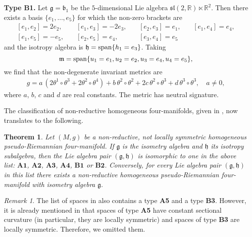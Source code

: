 \documentclass{amsart}
\theoremstyle{plain}
\newtheorem{theorem}{Theorem}
\theoremstyle{remark}
\newtheorem{remark}{Remark}
\def\R{\mathbb{R}}
\newcommand\B{{\mathfrak{b}}}
\newcommand\g{{\mathfrak{g}}}
\newcommand\h{{\mathfrak{h}}}
\newcommand\m{{\mathfrak{m}}}
\begin{document}
\medskip\noindent
{\bf Type B1.} Let $\g =\B_1$ be the $5$-dimensional Lie algebra  $\mathfrak{sl}(2,\R) \ltimes \R ^2 $. Then there exists a basis $\{e_1,\ldots,e_5\}$ for which the non-zero brackets are
\[
\begin{array}{llll}
[e_1,e_2]=2e_2, \quad & [e_1,e_3]=-2e_3, \quad & [e_2,e_3]=e_1, \quad & [e_1,e_4]=e_4, \\[2 pt]
[e_1,e_5]=-e_5, \quad & [e_2,e_5]=e_4, \quad  & [e_3,e_4]=e_5  \quad &
\end{array}
\]
and the isotropy algebra is $\h={\rm span}\{h_1=e_3\}$. Taking
\begin{equation}\label{eq:mB1}
\m= {\rm span}\{u_1=e_1,u_2=e_2,u_3=e_4,u_4=e_5\},
\end{equation}
we find that the non-degenerate invariant metrics are
\begin{equation}\label{gB1}
\begin{array}{l} g=a \, \left(2 \theta^1 \circ \theta^3+ 2\theta^2 \circ \theta^4 \right)+b \, \theta^2 \circ \theta^2 +2 c\, \theta^2 \circ \theta^3 +d\, \theta^3 \circ \theta^3, \quad a \neq 0,
\end{array}\end{equation}
where $a$, $b$, $c$ and $d$ are real constants. The metric has neutral signature.

\medskip

The classification of non-reductive homogeneous four-manifolds, given in \cite{FR}, now translates to the following.

\begin{theorem} \label{theo:classnonred}
Let $(M, g)$ be a non-reductive, not locally symmetric homogeneous pseudo-Rieman\-nian four-manifold. If $\g$ is the isometry algebra and $\h$ its isotropy subalgebra, then the Lie algebra pair $(\g,\h)$ is isomorphic to one in the above list: $\mathbf{A1}$, $\mathbf{A2}$, $\mathbf{A3}$, $\mathbf{A4}$, $\mathbf{B1}$ or $\mathbf{B2}$. Conversely, for every Lie algebra pair $(\g,\h)$ in this list there exists a non-reductive homogeneous pseudo-Riemannian four-manifold with isometry algebra $\g$.
\end{theorem}

\begin{remark}
The list of spaces in \cite{FR} also contains a type \textbf{A5} and a type \textbf{B3}. However, it is already mentioned in \cite{FR} that spaces of type \textbf{A5} have constant sectional curvature (in particular, they are locally symmetric) and  spaces of type \textbf{B3} are locally symmetric. Therefore, we omitted them.
\end{remark}
\end{document}
